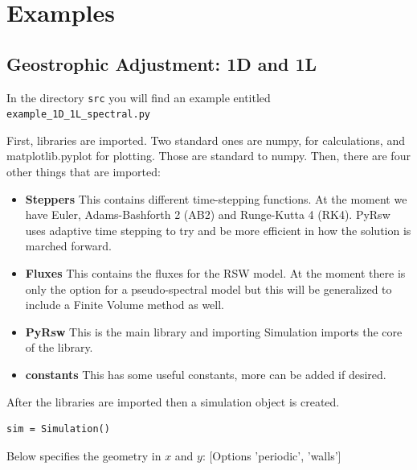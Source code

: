 \documentclass[11pt]{article}
\begin{document}

 



\section*{Examples}

\subsection*{Geostrophic Adjustment: 1D and 1L}

In the directory \texttt{src} you will find an example entitled \texttt{example\_1D\_1L\_spectral.py}

First, libraries are imported.  Two standard ones are numpy, for calculations, and matplotlib.pyplot for plotting.  Those are standard to numpy.  Then, there are four other things that are imported:
\begin{itemize}
\item {\bf Steppers} This contains different time-stepping functions.  At the moment we have Euler, Adams-Bashforth 2 (AB2) and Runge-Kutta 4 (RK4).  PyRsw uses adaptive time stepping to try and be more efficient in how the solution is marched forward.
\item {\bf Fluxes} This contains the fluxes for the RSW model.  At the moment there is only the option for a pseudo-spectral model but this will be generalized to include a Finite Volume method as well.
\item {\bf PyRsw} This is the main library and importing Simulation imports the core of the library.  
\item {\bf constants}  This has some useful constants, more can be added if desired.
\end{itemize}

\noindent After the libraries are imported then a simulation object is created.
\begin{lstlisting}
sim = Simulation()
\end{lstlisting}

\noindent  Below specifies the geometry in $x$ and $y$: [Options 'periodic', 'walls']
\end{document}
